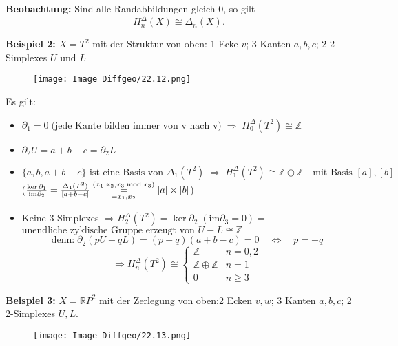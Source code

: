 \documentclass[fleqn, 12pt, letterpaper]{article}
\newcommand{\txt}[1]{\text{#1}}
\begin{document}
\textbf{Beobachtung:} Sind alle Randabbildungen gleich $0$, so gilt
\[
H_n^{\Delta}(X) \cong \Delta_n(X).
\]

\vspace{1cm}

\textbf{Beispiel 2:} $X = T^2$ mit der Struktur von oben: 1 Ecke $v$; 3 Kanten $a, b, c$; 2 2-Simplexes $U$ und $L$
    \begin{figure}[H]
    \centering
    \texttt{[image: Image Diffgeo/22.12.png]}
 \end{figure}

   Es gilt:
   \begin{itemize}
       \item \(
    \partial_1 = 0 \;\txt{(jede Kante bilden immer von v nach v)}\; \Rightarrow \; H_0^\Delta(T^2) \cong \mathbb{Z}
  \)
  
        \item  \(
    \partial_2 U = a + b - c = \partial_2 L
  \)
  
        \item \(
    \{a, b, a + b - c\} \text{ ist eine Basis von } \Delta_1(T^2)
  \; \Rightarrow \; 
    H_1^\Delta(T^2) \cong \mathbb{Z} \oplus \mathbb{Z} \quad \text{mit Basis } [a], [b]
  \)\\
  ($\frac{\ker \partial_1}{\txt{im} \partial_2}=\frac{\Delta_1(T^2)}{[a+b-c]}\underset{=x_1,x_2}{\overset{(x_1,x_2,x_3\;\txt{mod\;}x_3)}{=}}[a]\times [b]$)

  \item Keine 3-Simplexes $\Rightarrow H_2^\Delta(T^2) = \ker \partial_2\;(\txt{im}\partial_3=0) =$ \\
  \(
  \text{unendliche zyklische Gruppe erzeugt von } U - L \cong \mathbb{Z}
  \)
  \[
  \txt{denn:}\;\partial_2(pU + qL) = (p + q)(a + b - c) = 0 
  \quad \Leftrightarrow \quad p = -q
  \]
\[
\Rightarrow H_n^\Delta(T^2) \cong
\begin{cases}
  \mathbb{Z} & n = 0,2 \\
  \mathbb{Z} \oplus \mathbb{Z} & n = 1 \\
  0 & n \geq 3
\end{cases}
\]
   \end{itemize}
\textbf{Beispiel 3:} $X = \mathbb{R}P^2$ mit der Zerlegung von oben:2 Ecken $v, w$; 3 Kanten $a, b, c$; 2 2-Simplexes $U, L$.
    \begin{figure}[H]
    \centering
    \texttt{[image: Image Diffgeo/22.13.png]}
 \end{figure}
\end{document}
